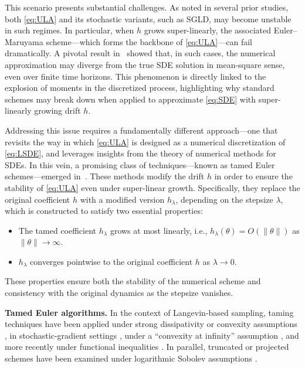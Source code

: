 \documentclass[11pt,a4paper,reqno]{amsart}
\theoremstyle{plain}
\theoremstyle{definition}
\theoremstyle{remark}
\begin{document}
This scenario presents substantial challenges. As noted in several prior studies, both \eqref{eq:ULA}
and its stochastic variants, such as SGLD, may become unstable in such regimes. In particular, when $h$
grows super-linearly, the associated Euler--Maruyama scheme---which forms the backbone of
\eqref{eq:ULA}---can fail dramatically. A pivotal result in~\cite{erdogdu2022convergence} showed that, in such cases,
the numerical approximation may diverge from the true SDE solution in mean-square sense, even over
finite time horizons. This phenomenon is directly linked to the explosion of moments in the discretized
process, highlighting why standard schemes may break down when applied to approximate \eqref{eq:SDE}
with super-linearly growing drift $h$.

Addressing this issue requires a fundamentally different approach---one that revisits the way in which
\eqref{eq:ULA} is designed as a numerical discretization of \eqref{eq:LSDE}, and leverages insights from the
theory of numerical methods for SDEs. In this vein, a promising class of techniques---known as tamed Euler
schemes---emerged in~\cite{hutzenthaler2012,tamed-euler,SabanisAoAP}. These methods modify the drift $h$ in order to ensure
the stability of \eqref{eq:ULA} even under super-linear growth. Specifically, they replace the original
coefficient $h$ with a modified version $h_\lambda$, depending on the stepsize $\lambda$, which is constructed
to satisfy two essential properties:
\begin{itemize}
\item[(P1)] The tamed coefficient $h_\lambda$ grows at most linearly, i.e.,
$h_\lambda(\theta)=O(\|\theta\|)$ as $\|\theta\|\to\infty$.
\item[(P2)] $h_\lambda$ converges pointwise to the original coefficient $h$ as $\lambda\to0$.
\end{itemize}
These properties ensure both the stability of the numerical scheme and consistency with the original
dynamics as the stepsize vanishes.
\par


\medskip
\textbf{Tamed Euler algorithms.}
In the context of Langevin-based sampling, taming techniques have been applied under strong
dissipativity or convexity assumptions \cite{tula,johnston2023kinetic,lytras2025contr}, in
stochastic-gradient settings \cite{TUSLA,lim2021non}, under a ``convexity at infinity''
assumption \cite{neufeld2024nonasymptoticconvergenceboundsmodified}, and more recently under functional inequalities
\cite{lytras2024tamed,lytras2025taming,lytras2025ktula}. In parallel, truncated or
projected schemes have been examined under logarithmic Sobolev assumptions
\cite{yang2025non}.
\end{document}
